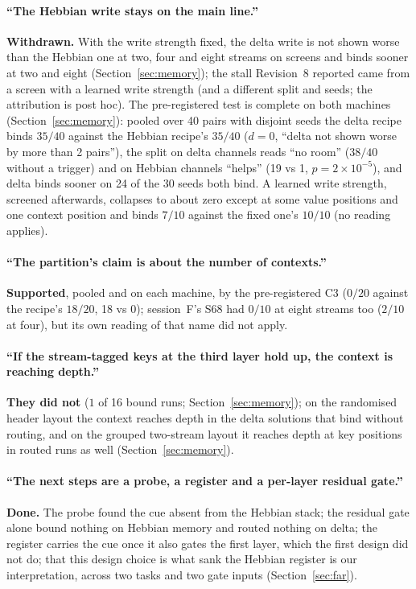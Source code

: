\documentclass[11pt]{article}
\begin{document}
\paragraph{``The Hebbian write stays on the main line.''} \textbf{Withdrawn.} With the write strength fixed, the delta write is not shown worse than the Hebbian one at two, four and eight streams on screens and binds sooner at two and eight (Section~\ref{sec:memory}); the stall Revision~8 reported came from a screen with a learned write strength (and a different split and seeds; the attribution is post hoc). The pre-registered test is complete on both machines (Section~\ref{sec:memory}): pooled over 40 pairs with disjoint seeds the delta recipe binds $35/40$ against the Hebbian recipe's $35/40$ ($d = 0$, ``delta not shown worse by more than 2 pairs''), the split on delta channels reads ``no room'' ($38/40$ without a trigger) and on Hebbian channels ``helps'' (19 vs 1, $p = 2\times10^{-5}$), and delta binds sooner on 24 of the 30 seeds both bind. A learned write strength, screened afterwards, collapses to about zero except at some value positions and one context position and binds $7/10$ against the fixed one's $10/10$ (no reading applies).

\paragraph{``The partition's claim is about the number of contexts.''} \textbf{Supported}, pooled and on each machine, by the pre-registered C3 ($0/20$ against the recipe's $18/20$, 18 vs 0); session~F's S68 had $0/10$ at eight streams too ($2/10$ at four), but its own reading of that name did not apply.

\paragraph{``If the stream-tagged keys at the third layer hold up, the context is reaching depth.''} \textbf{They did not} ($1$ of 16 bound runs; Section~\ref{sec:memory}); on the randomised header layout the context reaches depth in the delta solutions that bind without routing, and on the grouped two-stream layout it reaches depth at key positions in routed runs as well (Section~\ref{sec:memory}).

\paragraph{``The next steps are a probe, a register and a per-layer residual gate.''} \textbf{Done.} The probe found the cue absent from the Hebbian stack; the residual gate alone bound nothing on Hebbian memory and routed nothing on delta; the register carries the cue once it also gates the first layer, which the first design did not do; that this design choice is what sank the Hebbian register is our interpretation, across two tasks and two gate inputs (Section~\ref{sec:far}).
\end{document}
